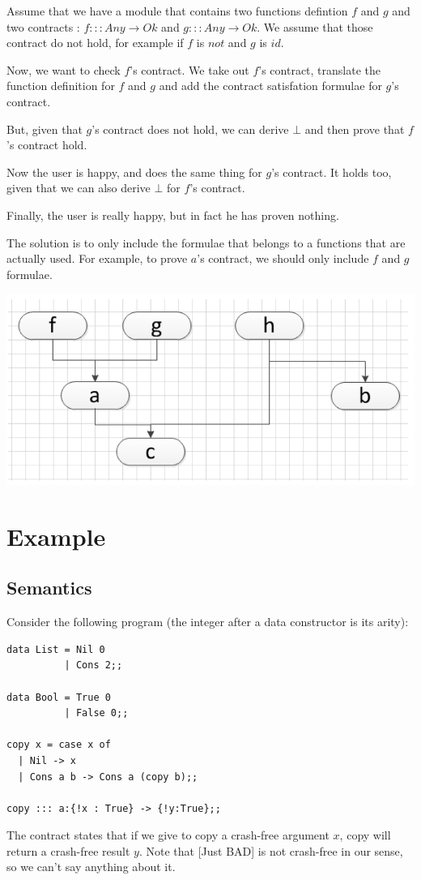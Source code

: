 \documentclass{article}
\begin{document}
Assume that we have a module that contains two functions defintion $f$
and $g$ and two contracts : $f ::: Any \to Ok$ and $g ::: Any \to
Ok$. We assume that those contract do not hold, for example if $f$ is
$not$ and $g$ is $id$.

Now, we want to check $f$'s contract. We take out $f$'s contract,
translate the function definition for $f$ and $g$ and add the contract
satisfation formulae for $g$'s contract.

But, given that $g$'s contract does not hold, we can derive $\bot$ and
then prove that $f$'s contract hold.

Now the user is happy, and does the same thing for $g$'s contract. It
holds too, given that we can also derive $\bot$ for $f$'s contract.

Finally, the user is really happy, but in fact he has proven nothing.


The solution is to only include the formulae that belongs to a
functions that are actually used. For example, to prove $a$'s
contract, we should only include $f$ and $g$ formulae.

\begin{center}
\includegraphics[scale=0.5]{flow.png}
\end{center}



\section{Example}


\subsection{Semantics}
Consider the following program (the integer after a data constructor is its arity):
\begin{verbatim}
data List = Nil 0
          | Cons 2;;

data Bool = True 0
          | False 0;;

copy x = case x of
  | Nil -> x
  | Cons a b -> Cons a (copy b);;

copy ::: a:{!x : True} -> {!y:True};;
\end{verbatim}
The contract states that if we give to copy a crash-free argument $x$, copy will return a crash-free result $y$.
Note that [Just BAD] is not crash-free in our sense, so we can't say anything about it. 
\end{document}
